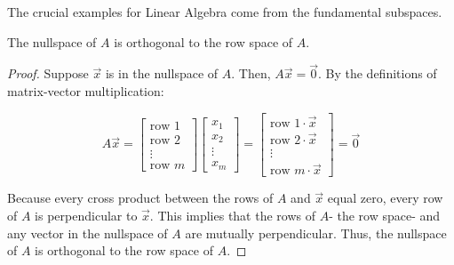 \documentclass{article}
\begin{document}
The crucial examples for Linear Algebra come from the fundamental subspaces.

\begin{theorem}
    The nullspace of $A$ is orthogonal to the row space of $A$.
    \begin{proof}
        Suppose $\vec{x}$ is in the nullspace of $A$.
        Then, $A \vec{x} = \vec{0}$.
        By the definitions of matrix-vector multiplication:

        \[A\vec{x} =
        \begin{bmatrix} %
            \textrm{row 1} \\
            \textrm{row 2} \\
            \vdots \\
            \textrm{row $m$}
        \end{bmatrix}
        \begin{bmatrix} %
            x_1 \\
            x_2 \\
            \vdots \\
            x_m 
        \end{bmatrix}
        =
        \begin{bmatrix} %
            \textrm{row 1} \cdot \vec{x} \\
            \textrm{row 2} \cdot \vec{x} \\
            \vdots \\
            \textrm{row $m$} \cdot \vec{x}
        \end{bmatrix}
        =
        \vec{0}
        \]

        Because every cross product between the rows of $A$ and $\vec{x}$ equal zero, every row of $A$ is perpendicular to $\vec{x}$.
        This implies that the rows of $A$- the row space- and any vector in the nullspace of $A$ are mutually perpendicular.
        Thus, the nullspace of $A$ is orthogonal to the row space of $A$.
    \end{proof}
\end{theorem}
\end{document}
